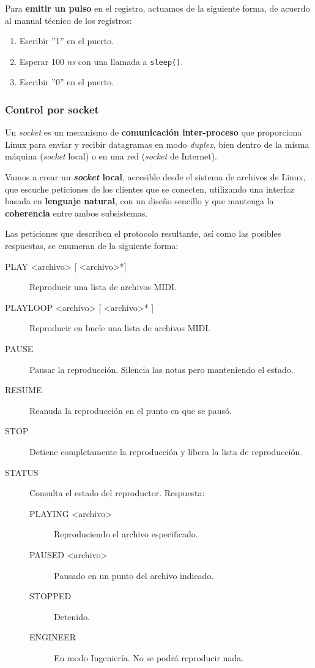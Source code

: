 \documentclass[10pt,a4paper]{article}
\begin{document}
	Para \textbf{emitir un pulso} en el registro, actuamos de la siguiente forma, de acuerdo al manual técnico de los registros:
	
	\begin{enumerate}
		\item Escribir ''1'' en el puerto.
		\item Esperar 100 \textit{ns} con una llamada a \verb|sleep()|.
		\item Escribir ''0'' en el puerto.
	\end{enumerate}
	
	\subsubsection*{Control por socket}
	
	Un \textit{socket} es un mecanismo de \textbf{comunicación inter-proceso} que proporciona Linux para enviar y recibir datagramas en modo \textit{duplex}, bien dentro de la misma máquina (\textit{socket} local) o en una red (\textit{socket} de Internet).
	
	Vamos a crear un \textbf{\textit{socket} local}, accesible desde el sistema de archivos de Linux, que escuche peticiones de los clientes que se conecten, utilizando una interfaz basada en \textbf{lenguaje natural}, con un diseño sencillo y que mantenga la \textbf{coherencia} entre ambos subsistemas.
	
	Las peticiones que describen el protocolo resultante, así como las posibles respuestas, se enumeran de la siguiente forma:
	
	\begin{description}
		\item[PLAY <archivo> {[} <archivo>*{]}] Reproducir una lista de archivos MIDI. 
		
		\item[PLAYLOOP <archivo> {[} <archivo>* {]}] Reproducir en bucle una lista de archivos MIDI. 
		
		\item[PAUSE] Pausar la reproducción. Silencia las notas pero manteniendo el estado. 
		
		\item[RESUME] Reanuda la reproducción en el punto en que se pausó. 
		
		\item[STOP] Detiene completamente la reproducción y libera la lista de reproducción.
		
		\item[STATUS] Consulta el estado del reproductor. Respuesta:
		
		\begin{description}
			\item[PLAYING <archivo>] Reproduciendo el archivo especificado.
			\item[PAUSED <archivo>] Pausado en un punto del archivo indicado.
			\item[STOPPED] Detenido.
			\item[ENGINEER] En modo Ingeniería. No se podrá reproducir nada.
		\end{description}
	\end{description}
	
\end{document}
